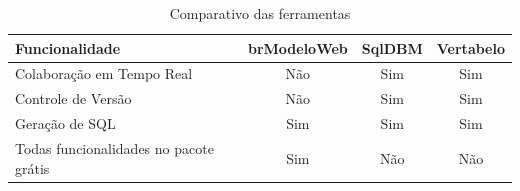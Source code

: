 \begin{table}[H]
    \centering
    \renewcommand{\arraystretch}{1.5}
        \begin{tabulary}{\textwidth}{|L|C|C|C|}
        \hline
        \textbf{Funcionalidade} & \textbf{brModeloWeb} & \textbf{SqlDBM} & \textbf{Vertabelo} \\
        \hline
        Colaboração em Tempo Real & Não & Sim & Sim \\
        \hline
        Controle de Versão & Não & Sim & Sim \\
        \hline
        Geração de SQL & Sim & Sim & Sim \\
        \hline
        Todas funcionalidades no pacote grátis & Sim & Não & Não \\
        \hline
        \end{tabulary}
    \caption{Comparativo das ferramentas}
    \label{tabela:comparativo-ferramentas}
\end{table}
